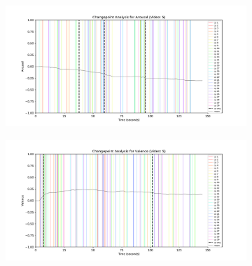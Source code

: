\documentclass[11pt, letterpaper]{article}
\begin{document}
  \begin{figure} \ContinuedFloat
        \centering
    \begin{subfigure}[t]{0.49\textwidth}
        \centering
        \includegraphics[width=\linewidth]{changepoints_V5_arousal_avg}
        \caption{} \label{fig:changepoints_V5_arousal_avg}
    \end{subfigure}
    \hfill
    \begin{subfigure}[t]{0.49\textwidth}
        \centering
        \includegraphics[width=\linewidth]{changepoints_V5_valence_avg} 
        \caption{} \label{fig:changepoints_V5_valence_avg}
    \end{subfigure}

    \vspace{1cm}
    

\end{figure}
\end{document}
